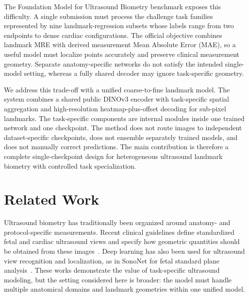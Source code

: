 \documentclass[runningheads]{llncs}
\begin{document}
The Foundation Model for Ultrasound Biometry benchmark exposes this difficulty. A single submission must process the challenge task families represented by nine landmark-regression subsets whose labels range from two endpoints to dense cardiac configurations. The official objective combines landmark MRE with derived measurement Mean Absolute Error (MAE), so a useful model must localize points accurately and preserve clinical measurement geometry. Separate anatomy-specific networks do not satisfy the intended single-model setting, whereas a fully shared decoder may ignore task-specific geometry.

We address this trade-off with a unified coarse-to-fine landmark model. The system combines a shared public DINOv3 encoder with task-specific spatial aggregation and high-resolution heatmap-plus-offset decoding for sub-pixel landmarks. The task-specific components are internal modules inside one trained network and one checkpoint. The method does not route images to independent dataset-specific checkpoints, does not ensemble separately trained models, and does not manually correct predictions. The main contribution is therefore a complete single-checkpoint design for heterogeneous ultrasound landmark biometry with controlled task specialization.

\section{Related Work}
Ultrasound biometry has traditionally been organized around anatomy- and protocol-specific measurements. Recent clinical guidelines define standardized fetal and cardiac ultrasound views and specify how geometric quantities should be obtained from these images~\cite{isuog2023cardiac}. Deep learning has also been used for ultrasound view recognition and localization, as in SonoNet for fetal standard plane analysis~\cite{baumgartner2017sononet}. These works demonstrate the value of task-specific ultrasound modeling, but the setting considered here is broader: the model must handle multiple anatomical domains and landmark geometries within one unified model.
\end{document}
